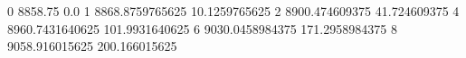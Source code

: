 0 8858.75 0.0
1 8868.8759765625 10.1259765625
2 8900.474609375 41.724609375
4 8960.7431640625 101.9931640625
6 9030.0458984375 171.2958984375
8 9058.916015625 200.166015625
